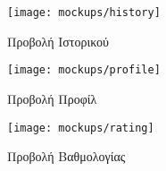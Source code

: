 \begin{figure}[H]
    \centering
    \begin{subfigure}[b]{0.3\textwidth}
        \texttt{[image: mockups/history]}
        \caption{Προβολή Ιστορικού}
    \end{subfigure}
    \hfill
    \begin{subfigure}[b]{0.3\textwidth}
        \texttt{[image: mockups/profile]}
        \caption{Προβολή Προφίλ}
    \end{subfigure}
    \hfill
    \begin{subfigure}[b]{0.3\textwidth}
        \texttt{[image: mockups/rating]}
        \caption{Προβολή Βαθμολογίας}
    \end{subfigure}
    \caption{}
\end{figure}







